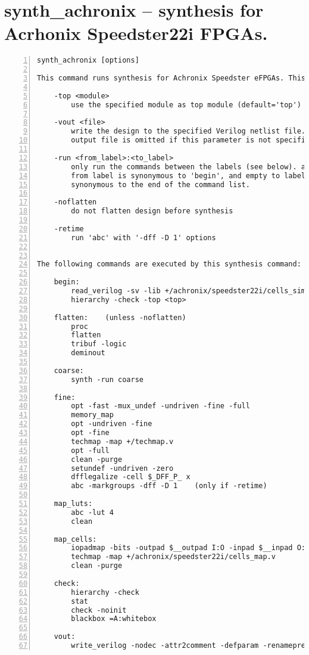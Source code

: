 \section{synth\_achronix -- synthesis for Acrhonix Speedster22i FPGAs.}
\label{cmd:synth_achronix}
\begin{lstlisting}[numbers=left,frame=single]
    synth_achronix [options]

This command runs synthesis for Achronix Speedster eFPGAs. This work is still experimental.

    -top <module>
        use the specified module as top module (default='top')

    -vout <file>
        write the design to the specified Verilog netlist file. writing of an
        output file is omitted if this parameter is not specified.

    -run <from_label>:<to_label>
        only run the commands between the labels (see below). an empty
        from label is synonymous to 'begin', and empty to label is
        synonymous to the end of the command list.

    -noflatten
        do not flatten design before synthesis

    -retime
        run 'abc' with '-dff -D 1' options


The following commands are executed by this synthesis command:

    begin:
        read_verilog -sv -lib +/achronix/speedster22i/cells_sim.v
        hierarchy -check -top <top>

    flatten:    (unless -noflatten)
        proc
        flatten
        tribuf -logic
        deminout

    coarse:
        synth -run coarse

    fine:
        opt -fast -mux_undef -undriven -fine -full
        memory_map
        opt -undriven -fine
        opt -fine
        techmap -map +/techmap.v
        opt -full
        clean -purge
        setundef -undriven -zero
        dfflegalize -cell $_DFF_P_ x
        abc -markgroups -dff -D 1    (only if -retime)

    map_luts:
        abc -lut 4
        clean

    map_cells:
        iopadmap -bits -outpad $__outpad I:O -inpad $__inpad O:I
        techmap -map +/achronix/speedster22i/cells_map.v
        clean -purge

    check:
        hierarchy -check
        stat
        check -noinit
        blackbox =A:whitebox

    vout:
        write_verilog -nodec -attr2comment -defparam -renameprefix syn_ <file-name>
\end{lstlisting}

